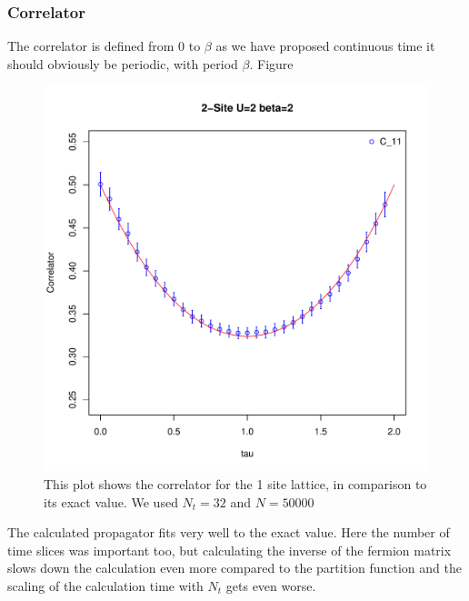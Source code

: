 \subsubsection{Correlator}
The correlator is defined from $0$ to $\beta$ as we have proposed continuous time it should obviously be periodic, with period $\beta$.
Figure 
\begin{figure}[H]
	\centering
	\includegraphics[width=0.5\linewidth]{figs/plot_C1t}
	\caption[Correlator 1 site]{This plot shows the correlator for the 1 site lattice, in comparison to its exact value. We used $N_t=32$ and $N=50000$}
	\label{fig:plotc1t}
\end{figure}
The calculated propagator fits very well to the exact value. Here the number of time slices was important too, but calculating the inverse of the fermion matrix slows down the calculation even more compared to the partition function and the scaling of the calculation time with $N_t$ gets even worse.
